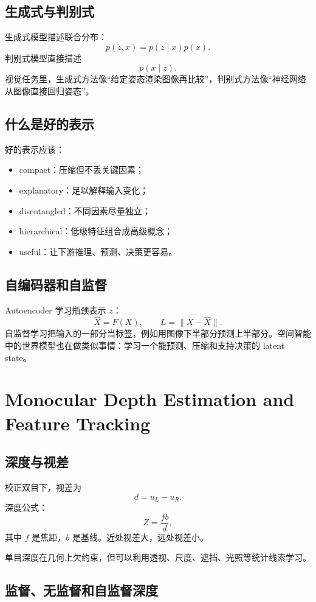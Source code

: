 \documentclass[11pt]{article}
\begin{document}
\subsection{生成式与判别式}

生成式模型描述联合分布：
\[
  p(z,x)=p(z\mid x)p(x).
\]
判别式模型直接描述
\[
  p(x\mid z).
\]
视觉任务里，生成式方法像“给定姿态渲染图像再比较”，判别式方法像“神经网络从图像直接回归姿态”。

\subsection{什么是好的表示}

好的表示应该：
\begin{itemize}
  \item compact：压缩但不丢关键因素；
  \item explanatory：足以解释输入变化；
  \item disentangled：不同因素尽量独立；
  \item hierarchical：低级特征组合成高级概念；
  \item useful：让下游推理、预测、决策更容易。
\end{itemize}

\subsection{自编码器和自监督}

Autoencoder 学习瓶颈表示 $z$：
\[
  \hat X=F(X),\qquad L=\|X-\hat X\|.
\]
自监督学习把输入的一部分当标签，例如用图像下半部分预测上半部分。空间智能中的世界模型也在做类似事情：学习一个能预测、压缩和支持决策的 latent state。

\section{Monocular Depth Estimation and Feature Tracking}

\subsection{深度与视差}

校正双目下，视差为
\[
  d=u_L-u_R.
\]
深度公式：
\[
  Z=\frac{fb}{d},
\]
其中 $f$ 是焦距，$b$ 是基线。近处视差大，远处视差小。

单目深度在几何上欠约束，但可以利用透视、尺度、遮挡、光照等统计线索学习。

\subsection{监督、无监督和自监督深度}
\end{document}

